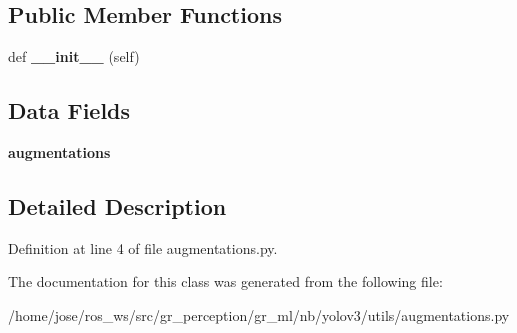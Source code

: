 \subsection*{Public Member Functions}
\begin{DoxyCompactItemize}
\item 
\mbox{\label{classutils_1_1augmentations_1_1DefaultAug_aab30c5aa4e7bcb69732d2ae050c7945e}} 
def {\bfseries \+\_\+\+\_\+init\+\_\+\+\_\+} (self)
\end{DoxyCompactItemize}
\subsection*{Data Fields}
\begin{DoxyCompactItemize}
\item 
\mbox{\label{classutils_1_1augmentations_1_1DefaultAug_a96f20df1f8b2ed5a7db6e91a4b2e74d0}} 
{\bfseries augmentations}
\end{DoxyCompactItemize}


\subsection{Detailed Description}


Definition at line 4 of file augmentations.\+py.



The documentation for this class was generated from the following file\+:\begin{DoxyCompactItemize}
\item 
/home/jose/ros\+\_\+ws/src/gr\+\_\+perception/gr\+\_\+ml/nb/yolov3/utils/augmentations.\+py\end{DoxyCompactItemize}

